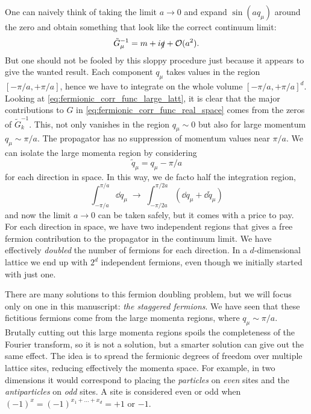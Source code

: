 One can naively think of taking the limit $a \to 0$ and expand $\sin(a q_{\mu})$ around the zero and obtain something that look like the correct continuum limit:
\begin{equation}
    \tilde{G}_{\mu}^{-1} = m + i \slashed{q} + \mathcal{O}(a^2).
\end{equation}
But one should not be fooled by this sloppy procedure just because it appears to give the wanted result.
Each component $q_{\mu}$ takes values in the region $[-\pi/a, +\pi/a]$, hence we have to integrate on the whole volume $[-\pi/a, +\pi/a]^d$.
Looking at \eqref{eq:fermionic_corr_func_large_latt}, it is clear that the major contributions to $G$ in \eqref{eq:fermionic_corr_func_real_space} comes from the zeros of $\tilde{G}_k^{-1}$.
This, not only vanishes in the region $q_{\mu} \sim 0$ but also for large momentum $q_{\mu} \sim \pi/a$.
The propagator has no suppression of momentum values near $\pi/a$.
We can isolate the large momenta region by considering
\begin{equation}
    \tilde{q}_{\mu} = q_{\mu} - \pi/a
\end{equation}
for each direction in space.
In this way, we de facto half the integration region,
\begin{equation}
    \int_{-\pi/a}^{\pi/a} \dd q_{\mu} \;\to\;
    \int_{-\pi/2a}^{\pi/2a} (\dd q_{\mu} + \dd \tilde{q}_{\mu})
\end{equation}
and now the limit $a \to 0$ can be taken safely, but it comes with a price to pay.
For each direction in space, we have two independent regions that gives a free fermion contribution to the propagator in the continuum limit.
We have effectively \emph{doubled} the number of fermions for each direction.
In a $d$-dimensional lattice we end up with $2^d$ independent fermions, even though we initially started with just one.

There are many solutions to this fermion doubling problem\citneeded, but we will focus only on one in this manuscript: \emph{the staggered fermions}\citneeded.
We have seen that these fictitious fermions come from the large momenta regions, where $q_{\mu} \sim \pi/a$.
Brutally cutting out this large momenta regions spoils the completeness of the Fourier transform, so it is not a solution, but a smarter solution can give out the same effect.
The idea is to spread the fermionic degrees of freedom over multiple lattice sites, reducing effectively the momenta space.
For example, in two dimensions it would correspond to placing the \emph{particles} on \emph{even} sites and the \emph{antiparticles} on \emph{odd} sites.
A site is considered even or odd when $(-1)^x = (-1)^{x_1 + \dots + x_d} = +1$ or $-1$.

